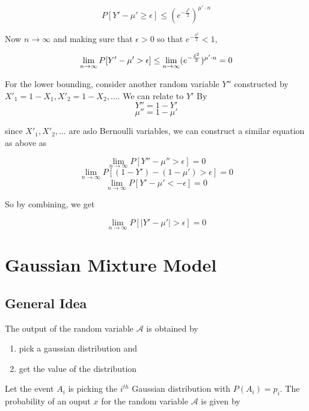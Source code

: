 \documentclass[openany]{book}
\begin{document}
	\[  P[Y' - \mu' \geq \epsilon]  \leq (e^{-\frac{\delta^2}{2} })^{\mu' \cdot n} \]
	
	Now $n \rightarrow \infty$ and making sure that $\epsilon>0$ so that $e^{-\frac{\delta^2}{2}}<1$,
	
	\begin{equation}
		\lim_{n \rightarrow \infty} P[Y' - \mu' > \epsilon]  \leq \lim_{n \rightarrow \infty} (e^{-\frac{\delta^2}{2} })^{\mu' \cdot n} = 0\\
	\end{equation}
	
	For the lower bounding, consider another random variable $Y''$ constructed by $X'_1 = 1-X_1, X'_2 = 1-X_2, \dots$. We can relate to $Y'$ By
	\[ Y'' = 1-Y' \]
	\[ \mu'' = 1-\mu' \]
	
	since $X'_1, X'_2, \dots $ are aslo Bernoulli variables, we can construct a similar equation as above as 
	
	
	\[ \lim_{n \rightarrow \infty} P[Y'' - \mu'' > \epsilon]= 0 \]
	\[ \lim_{n \rightarrow \infty} P[(1 - Y') - (1-\mu') > \epsilon]= 0 \]
	\[ \lim_{n \rightarrow \infty} P[Y' - \mu' < -\epsilon]= 0 \]
	
	So by combining, we get 
	
	\[ \lim_{n \rightarrow \infty} P[|Y' - \mu'| > \epsilon]= 0 \]
	
	
\chapter{Gaussian Mixture Model}

    \section{General Idea}
        The output of the random variable $\mathcal{A}$ is obtained by 
        \begin{enumerate}
            \item pick a gaussian distribution and
            \item get the value of the distribution
        \end{enumerate}
        
        Let the event $A_i$ is picking the $i^{th}$ Gaussian distribution with $P(A_i)=p_i$. The probability of an ouput $x$ for the 
        random variable $\mathcal{A}$ is given by 
        
\end{document}
